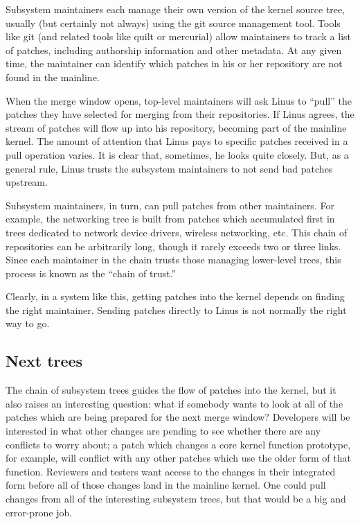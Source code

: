 \documentclass[a4paper,8pt,english]{sphinxmanual}
\begin{document}
Subsystem maintainers each manage their own version of the kernel source
tree, usually (but certainly not always) using the git source management
tool.  Tools like git (and related tools like quilt or mercurial) allow
maintainers to track a list of patches, including authorship information
and other metadata.  At any given time, the maintainer can identify which
patches in his or her repository are not found in the mainline.

When the merge window opens, top-level maintainers will ask Linus to ``pull''
the patches they have selected for merging from their repositories.  If
Linus agrees, the stream of patches will flow up into his repository,
becoming part of the mainline kernel.  The amount of attention that Linus
pays to specific patches received in a pull operation varies.  It is clear
that, sometimes, he looks quite closely.  But, as a general rule, Linus
trusts the subsystem maintainers to not send bad patches upstream.

Subsystem maintainers, in turn, can pull patches from other maintainers.
For example, the networking tree is built from patches which accumulated
first in trees dedicated to network device drivers, wireless networking,
etc.  This chain of repositories can be arbitrarily long, though it rarely
exceeds two or three links.  Since each maintainer in the chain trusts
those managing lower-level trees, this process is known as the ``chain of
trust.''

Clearly, in a system like this, getting patches into the kernel depends on
finding the right maintainer.  Sending patches directly to Linus is not
normally the right way to go.


\subsection{Next trees}
\label{process/2.Process:next-trees}
The chain of subsystem trees guides the flow of patches into the kernel,
but it also raises an interesting question: what if somebody wants to look
at all of the patches which are being prepared for the next merge window?
Developers will be interested in what other changes are pending to see
whether there are any conflicts to worry about; a patch which changes a
core kernel function prototype, for example, will conflict with any other
patches which use the older form of that function.  Reviewers and testers
want access to the changes in their integrated form before all of those
changes land in the mainline kernel.  One could pull changes from all of
the interesting subsystem trees, but that would be a big and error-prone
job.
\end{document}
